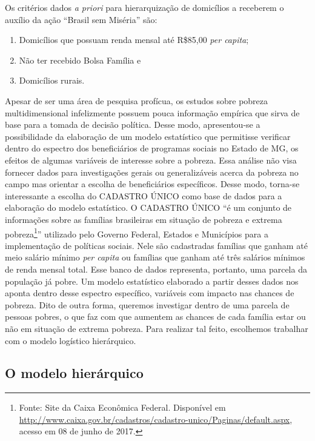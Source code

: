 \documentclass[a4paper, 12pt, openright, oneside, english, brazil, article]{abntex2}
\begin{document}
	Os critérios dados \textit{a priori} para hierarquização de domicílios a receberem o auxílio da ação ``Brasil sem Miséria'' são:
	
	\begin{enumerate}
		\item Domicílios que possuam renda mensal até R\$85,00 \textit{per capita};
		\item Não ter recebido Bolsa Família e
		\item Domicílios rurais.
	\end{enumerate}

	Apesar de ser uma área de pesquisa profícua, os estudos sobre pobreza multidimensional infelizmente possuem pouca informação empírica que sirva de base para a tomada de decisão política. Desse modo, apresentou-se a possibilidade da elaboração de um modelo estatístico que permitisse verificar dentro do espectro dos beneficiários de programas sociais no Estado de MG, os efeitos de algumas variáveis de interesse sobre a pobreza. Essa análise não visa fornecer dados para investigações gerais ou generalizáveis acerca da pobreza no campo mas orientar a escolha de beneficiários específicos. Desse modo, torna-se interessante a escolha do CADASTRO ÚNICO como base de dados para a elaboração do modelo estatístico. O CADASTRO ÚNICO ``é um conjunto de informações sobre as famílias brasileiras em situação de pobreza e extrema pobreza\footnote{Fonte: Site da Caixa Econômica Federal. Disponível em \url{http://www.caixa.gov.br/cadastros/cadastro-unico/Paginas/default.aspx}, acesso em 08 de junho de 2017.}'' utilizado pelo Governo Federal, Estados e Municípios para a implementação de políticas sociais. Nele são cadastradas famílias que ganham até meio salário mínimo \textit{per capita} ou famílias que ganham até três salários mínimos de renda mensal total. Esse banco de dados representa, portanto, uma parcela da população já pobre. Um modelo estatístico elaborado a partir desses dados nos aponta dentro desse espectro específico, variáveis com impacto nas chances de pobreza. Dito de outra forma, queremos investigar dentro de uma parcela de pessoas pobres, o que faz com que aumentem as chances de cada família estar ou não em situação de extrema pobreza. Para realizar tal feito, escolhemos trabalhar com o modelo logístico hierárquico.
	
	\subsection{O modelo hierárquico}
	
\end{document}
